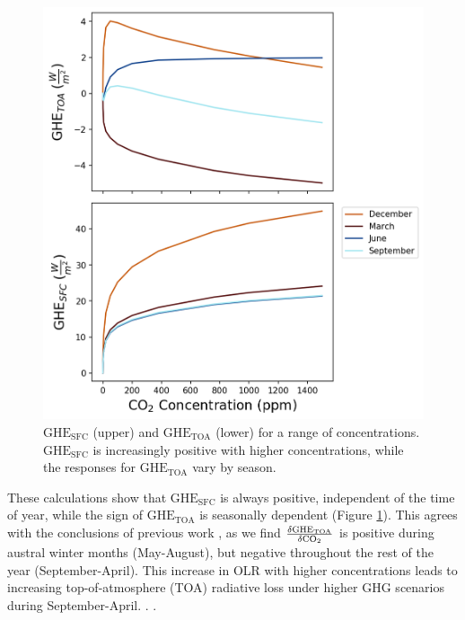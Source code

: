 \documentclass[draft]{agujournal2019}
\begin{document}
\begin{figure}[htb!]
\noindent\includegraphics[width=1\textwidth]{GH_sfc_CO2_effect.png}
\centering
\caption{$\text{GHE}_{\text{SFC}}$ (upper) and $\text{GHE}_{\text{TOA}}$ (lower) for a range of  concentrations. $\text{GHE}_{\text{SFC}}$ is increasingly positive with higher  concentrations, while the responses for $\text{GHE}_{\text{TOA}}$ vary by season. }
\label{fig:sfc_toa_GHE}
\end{figure}

These calculations show that ${\text{GHE}_\text{{SFC}}}$ is always positive, independent of the time of year, while the sign of ${\text{GHE}_\text{{TOA}}}$ is seasonally dependent (Figure \ref{fig:sfc_toa_GHE}). This agrees with the conclusions of previous work  \cite{schmithusen_how_2015}, as we find $\frac{\delta{\text{GHE}_\text{{TOA}}}}{\delta\ce{CO_2}}$ is positive during austral winter months (May-August), but negative throughout the rest of the year (September-April). This increase in OLR with higher  concentrations leads to increasing top-of-atmosphere (TOA) radiative loss under higher GHG scenarios during September-April.  \cite{huang_why_2014}.  \cite{huang_inhomogeneous_2016}.
\end{document}
